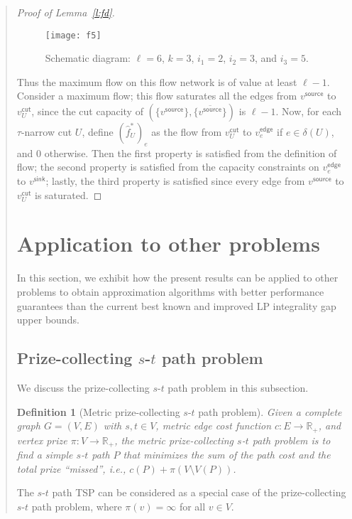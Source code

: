 \documentclass[11pt,letterpaper]{article}
\newtheorem{defn}{Definition}
\newcommand{\st}{\mbox{$s$-$t$} }
\begin{document}
\begin{quote}
\begin{proof}[Proof of Lemma~\ref{l:fd}]
\begin{figure}
\center
\texttt{[image: f5]}
\caption{Schematic diagram: $\ell=6$, $k=3$, $i_1=2$, $i_2=3$, and $i_3=5$.}
\label{f:fd2}
\end{figure}

Thus the maximum flow on this flow network is of value at least $\ell-1$. Consider a maximum flow; this flow saturates all the edges from $v^{\mathsf{source}}$ to $v^{\mathsf{cut}}_U$, since the cut capacity of $(\{v^{\mathsf{source}}\},\overline{\{v^{\mathsf{source}}\}})$ is $\ell-1$. Now, for each $\tau$-narrow cut $U$, define $(\hat f ^*_U)_e$ as the flow from $v^{\mathsf{cut}}_U$ to $v^{\mathsf{edge}}_e$ if $e\in \delta(U)$, and 0 otherwise. Then the first property is satisfied from the definition of flow; the second property is satisfied from the capacity constraints on $v_e^{\mathsf{edge}}$ to $v^{\mathsf{sink}}$; lastly, the third property is satisfied since every edge from $v^{\mathsf{source}}$ to $v^{\mathsf{cut}}_U$ is saturated.
\end{proof}

\section{Application to other problems}\label{s:appl}

In this section, we exhibit how the present results can be applied to other problems to obtain approximation algorithms with better performance guarantees than the current best known and improved LP integrality gap upper bounds.

\subsection{Prize-collecting \st path problem}\label{ss:prize}

We discuss the prize-collecting \st path problem in this subsection.

\begin{defn}[Metric prize-collecting \st path problem]
Given a complete graph $G=(V,E)$ with $s,t\in V$, metric edge cost function $c:E\to\mathbb{R}_+$, and vertex prize $\pi:V\to\mathbb{R}_+$, the metric prize-collecting \st path problem is to find a simple \st path $P$ that minimizes the sum of the path cost and the total prize ``missed'', i.e., $c(P)+\pi(V\setminus V(P))$.
\end{defn}

The \st path TSP can be considered as a special case of the prize-collecting \st path problem, where $\pi(v)=\infty$ for all $v\in V$.


\end{quote}
\end{document}
